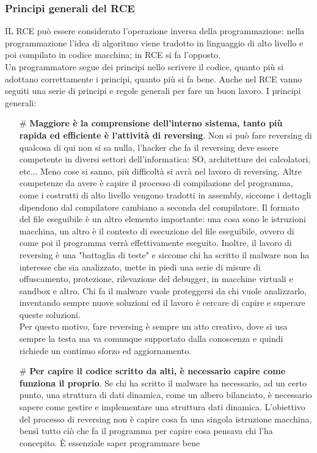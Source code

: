 \documentclass[12pt, oneside]{extbook}
\begin{document}
\subsubsection{Principi generali del RCE}
IL RCE può essere considerato l'operazione inversa della programmazione: nella programmazione l'idea di algoritmo viene tradotto in linguaggio di alto livello e poi compilato in codice macchina; in RCE si fa l'opposto.\\ Un programmatore segue dei principi nello scrivere il codice, quanto più si adottano correttamente i principi, quanto più si fa bene. Anche nel RCE vanno seguiti una serie di principi e regole generali per fare un buon lavoro. I principi generali:
\begin{itemize}
\item[\#] \textbf{Maggiore è la comprensione dell'interno sistema, tanto più rapida ed efficiente è l'attività di reversing}. Non si può fare reversing di qualcosa di qui non si sa nulla, l'hacker che fa il reversing deve essere competente in diversi settori dell'informatica: SO, architetture dei calcolatori, etc... Meno cose si sanno, più difficoltà si avrà nel lavoro di reversing. Altre competenze da avere è capire il processo di compilazione del programma, come i costrutti di alto livello vengono tradotti in assembly, siccome i dettagli dipendono dal compilatore cambiano a seconda del compilatore. Il formato del file eseguibile è un altro elemento importante: una cosa sono le istruzioni macchina, un altro è il contesto di esecuzione del file eseguibile, ovvero di come poi il programma verrà effettivamente eseguito. Inoltre, il lavoro di reversing è una "battaglia di teste" e siccome chi ha scritto il malware non ha interesse che sia analizzato, mette in piedi una serie di misure di offuscamento, protezione, rilevazione del debugger, in macchine virtuali e sandbox e altro. Chi fa il malware vuole proteggersi da chi vuole analizzarlo, inventando sempre nuove soluzioni ed il lavoro è cercare di capire e superare queste soluzioni.\\ Per questo motivo, fare reversing è sempre un atto creativo, dove si usa sempre la testa ma va comunque supportato dalla conoscenza e quindi richiede un continuo sforzo ed aggiornamento.
\item[\#] \textbf{Per capire il codice scritto da alti, è necessario capire come funziona il proprio}. Se chi ha scritto il malware ha necessario, ad un certo punto, una struttura di dati dinamica, come un albero bilanciato, è necessario sapere come gestire e implementare una struttura dati dinamica. L'obiettivo del processo di reversing non è capire cosa fa una singola istruzione macchina, bensì tutto ciò che fa il programma per capire cosa pensava chi l'ha concepito. È essenziale saper programmare bene

\end{itemize}
\end{document}
